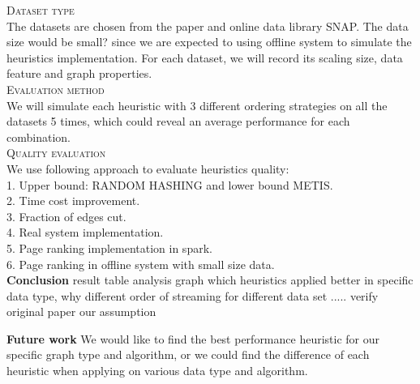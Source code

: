 \documentclass[12pt]{article}
\begin{document}
\textsc{Dataset type}\\
The datasets are chosen from the paper and online data library SNAP. The data size would be small? since we are expected to using offline system to simulate the heuristics implementation. For each dataset, we will record its scaling size, data feature and graph properties.\\
\textsc{Evaluation method}\\
We will simulate each heuristic with 3 different ordering strategies on all the datasets 5 times, which could reveal an average performance for each combination.\\
\textsc{Quality evaluation}\\
We use following approach to evaluate heuristics quality:\\
1. Upper bound: RANDOM HASHING and lower bound METIS.\\
2. Time cost improvement.\\
3. Fraction of edges cut.\\
4. Real system implementation.\\
5. Page ranking implementation in spark.\\
6. Page ranking in offline system with small size data.\\

\textbf{Conclusion}
 result table
 analysis graph
 	which heuristics applied better in specific data type, why
	different order of streaming for different data set
	.....
verify original paper
our assumption

\textbf{Future work}
We would like to find the best performance heuristic for our specific graph type and algorithm, or we could find the difference of each heuristic when applying on various data type and algorithm.



\end{document}
